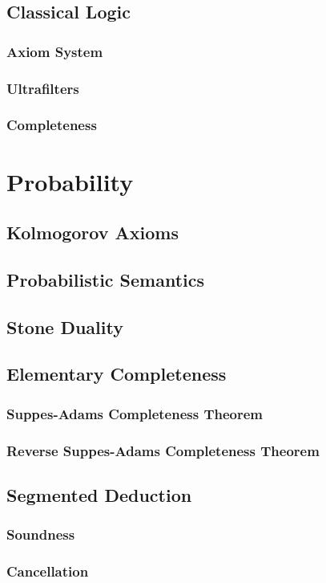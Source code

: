 \documentclass[a4paper,11pt]{book}
\begin{document}
\section{Classical Logic}
\subsection{Axiom System}
\subsection{Ultrafilters}
\subsection{Completeness}
  
\chapter{Probability}
\section{Kolmogorov Axioms}
\section{Probabilistic Semantics}
\section{Stone Duality}
\section{Elementary Completeness}
\subsection{Suppes-Adams Completeness Theorem}
\subsection{Reverse Suppes-Adams Completeness Theorem}
\section{Segmented Deduction}
\subsection{Soundness}
\subsection{Cancellation}
\end{document}
